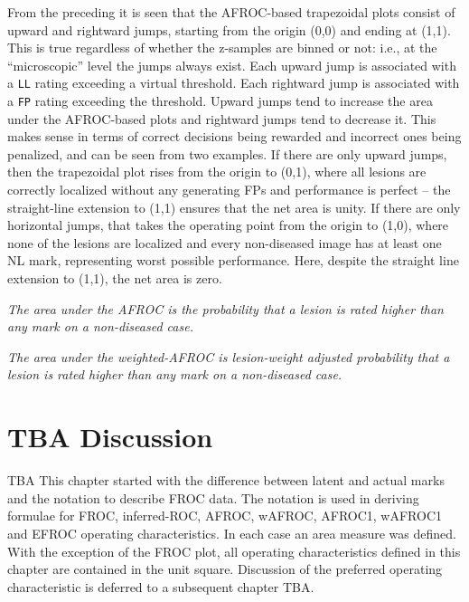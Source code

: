 \documentclass[
]{book}
\begin{document}
From the preceding it is seen that the AFROC-based trapezoidal plots consist of upward and rightward jumps, starting from the origin (0,0) and ending at (1,1). This is true regardless of whether the z-samples are binned or not: i.e., at the ``microscopic'' level the jumps always exist. Each upward jump is associated with a \texttt{LL} rating exceeding a virtual threshold. Each rightward jump is associated with a \texttt{FP} rating exceeding the threshold. Upward jumps tend to increase the area under the AFROC-based plots and rightward jumps tend to decrease it. This makes sense in terms of correct decisions being rewarded and incorrect ones being penalized, and can be seen from two examples. If there are only upward jumps, then the trapezoidal plot rises from the origin to (0,1), where all lesions are correctly localized without any generating FPs and performance is perfect -- the straight-line extension to (1,1) ensures that the net area is unity. If there are only horizontal jumps, that takes the operating point from the origin to (1,0), where none of the lesions are localized and every non-diseased image has at least one NL mark, representing worst possible performance. Here, despite the straight line extension to (1,1), the net area is zero.

\emph{The area under the AFROC is the probability that a lesion is rated higher than any mark on a non-diseased case.}

\emph{The area under the weighted-AFROC is lesion-weight adjusted probability that a lesion is rated higher than any mark on a non-diseased case.}

\hypertarget{empirical-Discussion}{%
\section{TBA Discussion}\label{empirical-Discussion}}

TBA This chapter started with the difference between latent and actual marks and the notation to describe FROC data. The notation is used in deriving formulae for FROC, inferred-ROC, AFROC, wAFROC, AFROC1, wAFROC1 and EFROC operating characteristics. In each case an area measure was defined. With the exception of the FROC plot, all operating characteristics defined in this chapter are contained in the unit square. Discussion of the preferred operating characteristic is deferred to a subsequent chapter TBA.
\end{document}
